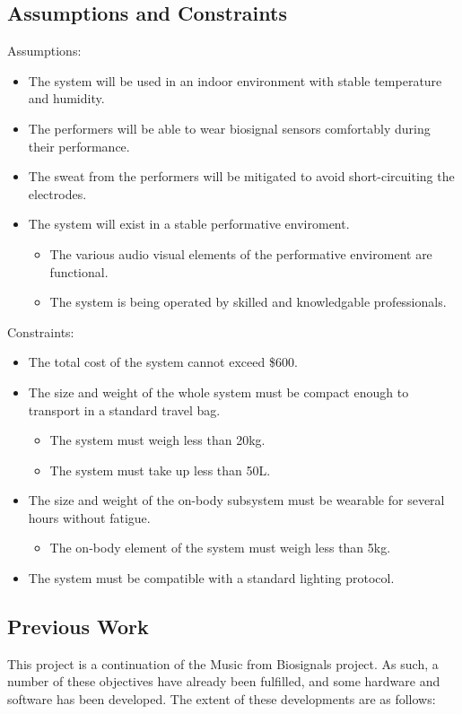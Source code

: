 \subsection{Assumptions and Constraints}
Assumptions:
\begin{itemize}
    \item The system will be used in an indoor environment with stable temperature and humidity.
    \item The performers will be able to wear biosignal sensors comfortably during their performance.
    \item The sweat from the performers will be mitigated to avoid short-circuiting the electrodes.
    \item The system will exist in a stable performative enviroment.
        \begin{itemize}
                \item The various audio visual elements of the performative enviroment are functional.
                \item The system is being operated by skilled and knowledgable professionals.
        \end{itemize}
\end{itemize}

Constraints:
\begin{itemize}
    \item The total cost of the system cannot exceed \$600.
    \item The size and weight of the whole system must be compact enough to transport in a standard travel bag.
        \begin{itemize}
                \item The system must weigh less than 20kg.
                \item The system must take up less than 50L.
        \end{itemize}
    \item The size and weight of the on-body subsystem must be wearable for several hours without fatigue.
        \begin{itemize}
                \item The on-body element of the system must weigh less than 5kg.
        \end{itemize}
    \item The system must be compatible with a standard lighting protocol.
\end{itemize}

\subsection{Previous Work}
This project is a continuation of the Music from Biosignals project.
As such, a number of these objectives have already been fulfilled, and some hardware and software has been developed.
The extent of these developments are as follows:

